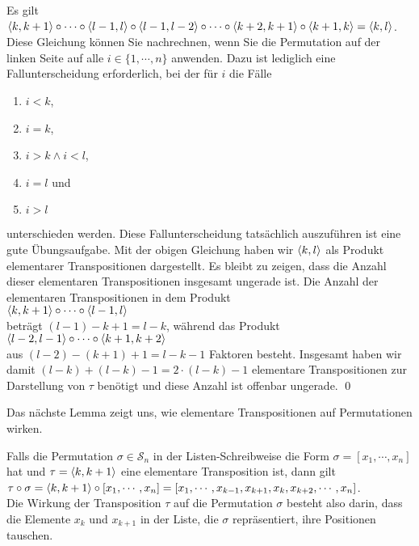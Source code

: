\proof
Es gilt 
\\[0.2cm]
\hspace*{1.3cm}
$\pair(k,k+1) \circ \cdots \circ \pair(l-1,l) \circ \pair(l-1,l-2) \circ \cdots \circ \pair(k+2,k+1)\circ \pair(k+1,k) = \pair(k,l)$.  
\\[0.2cm]
Diese Gleichung k\"onnen Sie nachrechnen, wenn Sie die Permutation auf der linken Seite
auf alle $i \in \{1,\cdots,n\}$ anwenden.  Dazu ist lediglich eine Fallunterscheidung erforderlich,
bei der f\"ur $i$ die F\"alle
\begin{enumerate}
\item $i < k$,
\item $i = k$,
\item $i > k \wedge i < l$,
\item $i = l$ und
\item $i > l$
\end{enumerate}
unterschieden werden.  Diese Fallunterscheidung tats\"achlich auszuf\"uhren ist eine gute \"Ubungsaufgabe.
Mit der obigen Gleichung haben wir $\pair(k,l)$ als Produkt elementarer Transpositionen dargestellt. 
Es bleibt zu zeigen, dass die Anzahl dieser elementaren Transpositionen insgesamt ungerade ist.  Die Anzahl der
elementaren Transpositionen in dem Produkt
\\[0.2cm]
\hspace*{1.3cm}
$\pair(k,k+1) \circ \cdots \circ \pair(l-1,l)$
\\[0.2cm]
betr\"agt $(l - 1) - k + 1 = l - k$, w\"ahrend das Produkt
\\[0.2cm]
\hspace*{1.3cm}
$\pair(l-2,l-1) \circ \cdots \circ \pair(k+1,k+2)$
\\[0.2cm]
aus $(l-2) - (k+1) + 1 = l - k -1$ Faktoren besteht. 
Insgesamt haben wir damit $(l - k) + (l - k) - 1 = 2 \cdot (l-k) -1$ elementare Transpositionen zur
Darstellung von $\tau$ ben\"otigt und diese Anzahl ist offenbar ungerade.
\qed

Das n\"achste Lemma zeigt uns, wie elementare Transpositionen auf Permutationen wirken.

\begin{Lemma}
  Falls die Permutation $\sigma \in \mathcal{S}_n$ in der Listen-Schreibweise die Form $\sigma = [x_1,\cdots,x_n]$ hat 
  und $\tau = \pair(k, k+1)$ eine elementare Transposition ist, dann gilt
  \\[0.2cm]
  \hspace*{1.3cm}
  $\tau \circ \sigma = \pair(k,k+1) \circ [x_1,\cdots,x_n] = [x_1, \cdots, x_{k-1},x_{k+1}, x_k,x_{k+2},\cdots, x_n]$.
  \\[0.2cm]
  Die Wirkung der Transposition $\tau$ auf die Permutation $\sigma$ besteht also darin, dass die Elemente
  $x_k$ und $x_{k+1}$ in der Liste, die $\sigma$ repr\"asentiert, ihre Positionen tauschen.
\end{Lemma}

